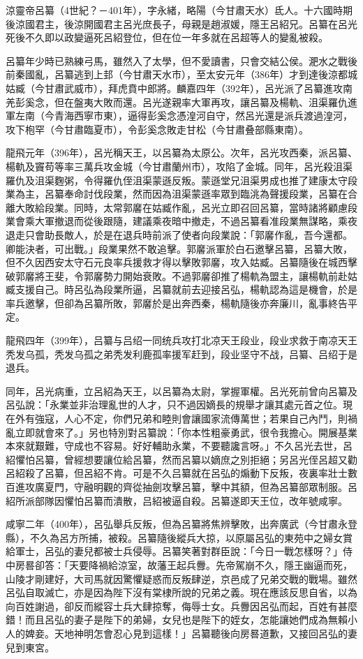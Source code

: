 涼靈帝呂纂（4世紀？－401年），字永緒，略陽（今甘肅天水）氐人。十六國時期後涼國君主，後涼開國君主呂光庶長子，母親是趙淑媛，隱王呂紹兄。呂纂在呂光死後不久即以政變逼死呂紹登位，但在位一年多就在呂超等人的變亂被殺。

呂纂年少時已熟練弓馬，雖然入了太學，但不愛讀書，只會交結公侯。淝水之戰後前秦國亂，呂纂逃到上邽（今甘肅天水市），至太安元年（386年）才到達後涼都城姑臧（今甘肅武威市），拜虎賁中郎將。麟嘉四年（392年），呂光派了呂纂進攻南羌彭奚念，但在盤夷大敗而還。呂光遂親率大軍再攻，讓呂纂及楊軌、沮渠羅仇進軍左南（今青海西寧市東），逼得彭奚念憑湟河自守，然呂光還是派兵渡過湟河，攻下枹罕（今甘肅臨夏市），令彭奚念敗走甘松（今甘肅叠部縣東南）。

龍飛元年（396年），呂光稱天王，以呂纂為太原公。次年，呂光攻西秦，派呂纂、楊軌及竇苟等率三萬兵攻金城（今甘肅蘭州市），攻陷了金城。同年，呂光殺沮渠羅仇及沮渠麴粥，令得羅仇侄沮渠蒙遜反叛。蒙遜堂兄沮渠男成也推了建康太守段業為主，呂纂奉命討伐段業，然而因為沮渠蒙遜率眾到臨洮為聲援段業，呂纂在合離大敗給段業。同時，太常郭黁在姑臧作亂，呂光立即召回呂纂，當時諸將顧慮段業會乘大軍撤退而從後跟隨，建議乘夜暗中撤走，不過呂纂看准段業無謀略，乘夜退走只會助長敵人，於是在退兵時前派了使者向段業說：「郭黁作亂，吾今還都。卿能決者，可出戰。」段業果然不敢追擊。郭黁派軍於白石邀擊呂纂，呂纂大敗，但不久因西安太守石元良率兵援救才得以擊敗郭黁，攻入姑臧。呂纂隨後在城西擊破郭黁將王斐，令郭黁勢力開始衰敗。不過郭黁卻推了楊軌為盟主，讓楊軌前赴姑臧支援自己。時呂弘為段業所逼，呂纂就前去迎接呂弘，楊軌認為這是機會，於是率兵邀擊，但卻為呂纂所敗，郭黁於是出奔西秦，楊軌隨後亦奔廉川，亂事終告平定。

龍飛四年（399年），吕纂与吕绍一同统兵攻打北凉天王段业，段业求救于南凉天王秃发乌孤，秃发乌孤之弟秃发利鹿孤率援军赶到，段业坚守不战，吕纂、吕绍于是退兵。

同年，呂光病重，立呂紹為天王，以呂纂為太尉，掌握軍權。呂光死前曾向呂纂及呂弘說：「永業並非治理亂世的人才，只不過因嫡長的規舉才讓其處元首之位。現在外有強寇，人心不定，你們兄弟和睦則會讓國家流傳萬世；若果自己內鬥，則禍亂立即就會來了。」另也特別對呂纂說：「你本性粗豪勇武，很令我擔心。開展基業本來就艱難，守成也不容易。好好輔助永業，不要聽讒言呀。」不久呂光去世，呂紹懼怕呂纂，曾經想要讓位給呂纂，然而呂纂以嫡庶之別拒絕；另呂光侄呂超又勸呂紹殺了呂纂，但呂紹不肯。可是不久吕纂就在呂弘的煽動下反叛，夜裏率壯士數百進攻廣夏門，守融明觀的齊從抽劍攻擊呂纂，擊中其額，但為呂纂部眾制服。呂紹所派部隊因懼怕呂纂而潰散，吕紹被逼自殺。呂纂遂即天王位，改年號咸寧。

咸寧二年（400年），呂弘舉兵反叛，但為呂纂將焦辨擊敗，出奔廣武（今甘肅永登縣），不久為呂方所捕，被殺。呂纂隨後縱兵大掠，以原屬呂弘的東苑中之婦女賞給軍士，呂弘的妻兒都被士兵侵辱。呂纂笑著對群臣說：「今日一戰怎樣呀？」侍中房晷卻答：「天要降禍給涼室，故藩王起兵釁。先帝駕崩不久，隱王幽逼而死，山陵才剛建好，大司馬就因驚懼疑惑而反叛肆逆，京邑成了兄弟交戰的戰場。雖然呂弘自取滅亡，亦是因為陛下沒有棠棣所說的兄弟之義。現在應該反思自省，以為向百姓謝過，卻反而縱容士兵大肆掠奪，侮辱士女。兵釁因呂弘而起，百姓有甚麼錯！而且呂弘的妻子是陛下的弟婦，女兒也是陛下的姪女，怎能讓她們成為無賴小人的婢妾。天地神明怎會忍心見到這樣！」呂纂聽後向房晷道歉，又接回呂弘的妻兒到東宮。

